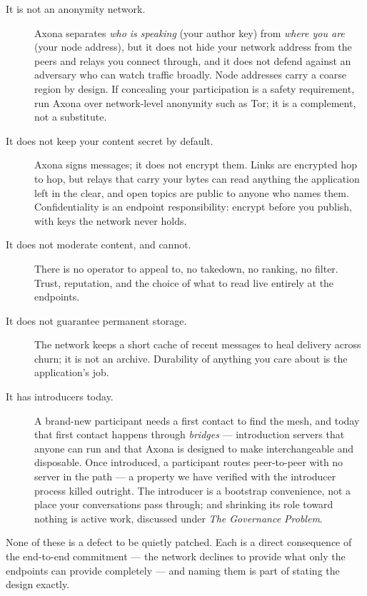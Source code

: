 \documentclass[nobib,justified]{tufte-handout}
\begin{document}
\begin{description}
\item[It is not an anonymity network.] Axona separates \emph{who is speaking}
(your author key) from \emph{where you are} (your node address), but it does not
hide your network address from the peers and relays you connect through, and it
does not defend against an adversary who can watch traffic broadly. Node
addresses carry a coarse region by design. If concealing your participation is a
safety requirement, run Axona over network-level anonymity such as Tor; it is a
complement, not a substitute.

\item[It does not keep your content secret by default.] Axona signs messages; it
does not encrypt them. Links are encrypted hop to hop, but relays that carry your
bytes can read anything the application left in the clear, and open topics are
public to anyone who names them. Confidentiality is an endpoint responsibility:
encrypt before you publish, with keys the network never holds.

\item[It does not moderate content, and cannot.] There is no operator to appeal
to, no takedown, no ranking, no filter. Trust, reputation, and the choice of what
to read live entirely at the endpoints.

\item[It does not guarantee permanent storage.] The network keeps a short cache
of recent messages to heal delivery across churn; it is not an archive.
Durability of anything you care about is the application's job.

\item[It has introducers today.] A brand-new
participant needs a first contact to find the mesh, and today that first contact
happens through \emph{bridges} --- introduction servers that anyone can run and
that Axona is designed to make interchangeable and disposable. Once introduced, a
participant routes peer-to-peer with no server in the path --- a property we have
verified with the introducer process killed outright. The introducer is a
bootstrap convenience, not a place your conversations pass through; and shrinking
its role toward nothing is active work, discussed under \emph{The Governance
Problem}.
\end{description}

None of these is a defect to be quietly patched. Each is a direct consequence of
the end-to-end commitment --- the network declines to provide what only the
endpoints can provide completely --- and naming them is part of stating the design exactly.
\end{document}
